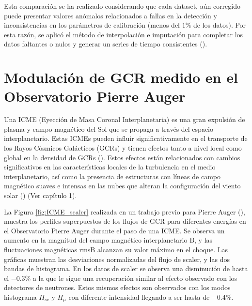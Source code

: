 Esta comparación se ha realizado considerando que cada dataset, aún corregido puede presentar valores anómalos relacionados a fallas en la detección y inconsistencias en los parámetros de calibración (menos del $1\%$ de los datos). Por esta razón, se aplicó el método de interpolación e imputación para completar los datos faltantes o nulos y generar un series de tiempo consistentes (\cite{wang_2019}).
%


\section{Modulación de GCR medido en el Observatorio Pierre Auger}
Una ICME (Eyección de Masa Coronal Interplanetaria) es una gran expulsión de plasma y campo magnético del Sol que se propaga a través del espacio interplanetario. Estas ICMEs pueden influir significativamente en el transporte de los Rayos Cósmicos Galácticos (GCRs) y tienen efectos tanto a nivel local como global en la densidad de GCRs (\cite{Davies_2023}). Estos efectos están relacionados con cambios significativos en las características locales de la turbulencia en el medio interplanetario, así como la presencia de estructuras con líneas de campo magnético suaves e intensas en las nubes que alteran la configuración del viento solar (\cite{Krittinatham_2009}) (Ver capítulo 1).

La Figura \ref{fig:ICME_scaler} realizada en un trabajo previo para Pierre Auger (\cite{masias_2017}), muestra los perfiles superpuestos de los flujos de GCR para diferentes energías en el Observatorio Pierre Auger durante el paso de una ICME. Se observa un aumento en la magnitud del campo magnético interplanetario B, y las fluctuaciones magnéticas rmsB alcanzan su valor máximo en el choque. Las gráficas muestran las desviaciones normalizadas del flujo de scaler, y las dos bandas de histograma. En los datos de scaler se observa una disminución de hasta el −0.3\% a la que le sigue una recuperación similar al efecto observado con los detectores de neutrones. Estos mismos efectos son observados con los modos histograma $H_{sc}$ y $H_{\mu}$ con diferente intensidad llegando a ser hasta de −0.4\%.

